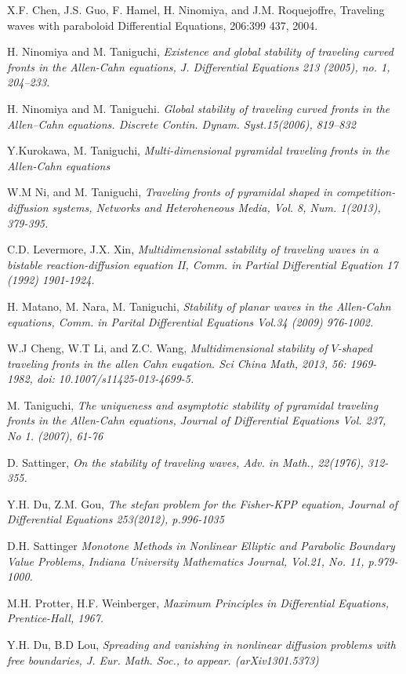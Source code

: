 \documentclass[12pt, a4paper]{article}
\numberwithin{equation}{section}
\begin{document}
\begin{CJK}{UTF8}{bkai}
\begin{thebibliography}{99}
	 X.F. Chen, J.S. Guo, F. Hamel, H. Ninomiya, and J.M. Roquejoffre,  Traveling waves with paraboloid
Differential Equations, 206:399 437, 2004.

	 H. Ninomiya and M. Taniguchi, {\it Existence and global stability of traveling curved fronts in the Allen-Cahn equations, J. Differential Equations 213 (2005), no. 1, 204--233.}

	 H. Ninomiya and M. Taniguchi. {\it Global stability of traveling curved fronts in the Allen–Cahn equations. Discrete Contin. Dynam. Syst.15(2006), 819–832}

	 Y.Kurokawa, M. Taniguchi, {\it Multi-dimensional pyramidal traveling fronts in the Allen-Cahn equations}

	 W.M Ni, and M. Taniguchi, {\it Traveling fronts of pyramidal shaped in competition-diffusion systems, Networks and Heteroheneous Media, Vol. 8, Num. 1(2013), 379-395.}

	 C.D. Levermore, J.X. Xin, {\it Multidimensional sstability of traveling waves in a bistable reaction-diffusion equation II, Comm. in Partial Differential Equation 17 (1992) 1901-1924.}

	 H. Matano, M. Nara, M. Taniguchi, {\it Stability of planar waves in the Allen-Cahn equations, Comm. in Parital Differential Equations Vol.34 (2009) 976-1002.}

	 W.J Cheng, W.T Li, and Z.C. Wang, {\it Multidimensional stability of $V$-shaped traveling fronts in the allen Cahn euqation. Sci China Math, 2013, 56: 1969-1982, doi: 10.1007/s11425-013-4699-5.}
	
	 M. Taniguchi, {\it The uniqueness and asymptotic stability of pyramidal traveling  fronts in the Allen-Cahn equations, Journal of Differential Equations Vol. 237, No 1. (2007), 61-76}

	 D. Sattinger, {\it On the stability of traveling waves, Adv. in Math., 22(1976), 312-355.}

	 Y.H. Du, Z.M. Gou, {\it The stefan problem for the Fisher-KPP equation, Journal of Differential Equations 253(2012), p.996-1035}

	 D.H. Sattinger {\it Monotone Methods in Nonlinear Elliptic and Parabolic Boundary Value Problems, Indiana University Mathematics Journal, Vol.21, No. 11, p.979-1000.}

	 M.H. Protter, H.F. Weinberger, {\it Maximum Principles in Differential Equations, Prentice-Hall, 1967.}

	 Y.H. Du, B.D Lou, {\it Spreading and vanishing in nonlinear diffusion problems with free boundaries, J. Eur. Math. Soc., to appear. (arXiv1301.5373)}

	\
\end{thebibliography}
\end{CJK}
\end{document}

